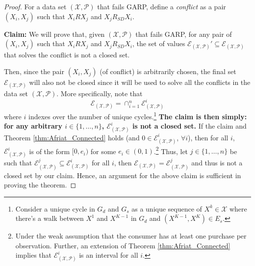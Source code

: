 \documentclass{article} %
\theoremstyle{style1}
\theoremstyle{example}
\begin{document}
\AfriatNonCompact*
\begin{proof}
For a data set $(\mathcal{X},\mathcal{P})$ that fails GARP, define a \emph{conflict} as a pair $(X_i,X_j)$ such that $X_i R X_j$ and $X_j R_{SD} X_i$. 

\textbf{Claim:} We will prove that, given $(\mathcal{X},\mathcal{P})$ that fails GARP, for any pair of $(X_i,X_j)$ such that $X_i R X_j$ and $X_j R_{SD} X_i$, the set of values $\mathcal{E}_{(\mathcal{X},\mathcal{P})}'\subseteq \mathcal{E}_{(\mathcal{X},\mathcal{P})}$ that solves the conflict is not a closed set. 

Then, since the pair $(X_i,X_j)$ (of conflict) is arbitrarily chosen, the final set $\mathcal{E}_{(\mathcal{X},\mathcal{P})}$ will also not be closed since it will be used to solve all the conflicts in the data set $(\mathcal{X},\mathcal{P})$. More specifically, note that 
$$\mathcal{E}_{(\mathcal{X},\mathcal{P})}=\cap_{i=1}^n \mathcal{E}^i_{(\mathcal{X},\mathcal{P})}$$ where $i$ indexes over the number of unique cycles.\footnote{Consider a unique cycle in $G_d$ and $G_s$ as a unique sequence of $X^k\in\mathcal{X}$ where there's a walk between $X^1$ and $X^{K-1}$ in $G_d$ and $(X^{K-1},X^K)\in E_s$.} \textbf{The claim is then simply: for any arbitrary $i\in\{1,\ldots, n\}$, $\mathcal{E}^i_{(\mathcal{X},\mathcal{P})}$ is not a closed set.} If the claim and Theorem \ref{thm:Afriat_Connected} holds (and $0\in\mathcal{E}^i_{(\mathcal{X},\mathcal{P})}$, $\forall i$), then for all $i$, $\mathcal{E}^i_{(\mathcal{X},\mathcal{P})}$ is of the form $[0,e_i)$ for some $e_i\in(0,1)$.\footnote{Under the weak assumption that the consumer has at least one purchase per observation. Further, an extension of Theorem \ref{thm:Afriat_Connected} implies that $\mathcal{E}^i_{(\mathcal{X},\mathcal{P})}$ is an interval for all $i$.} Thus, let $j\in\{1,\ldots,n\}$ be such that $\mathcal{E}^j_{(\mathcal{X},\mathcal{P})}\subseteq \mathcal{E}^i_{(\mathcal{X},\mathcal{P})}$ for all $i$, then $\mathcal{E}_{(\mathcal{X},\mathcal{P})}=\mathcal{E}^j_{(\mathcal{X},\mathcal{P})}$ and thus is not a closed set by our claim. Hence, an argument for the above claim is sufficient in proving the theorem.


\end{proof}
\end{document}
